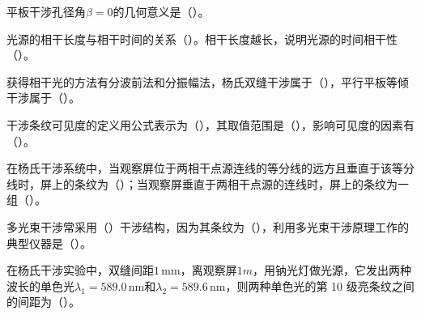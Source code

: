 \documentclass[padl, analysis, notocnum]{ExBook}
\newcommand{\answerarea}[1][3.5cm]{%
  \par\vspace{1mm}%
  \noindent{\color{themeColor!35}\rule{\linewidth}{0.4pt}}\par
  \noindent\begin{minipage}[t][#1][t]{\linewidth}\vspace{0pt}\end{minipage}\par
  \noindent{\color{themeColor!35}\rule{\linewidth}{0.4pt}}\par
}
\begin{document}
\begin{qitems}[startnum=2]
\qitem 平板干涉孔径角$\beta =0$的几何意义是（\hspace{1.6em}）。
\label{q:225:start}
\answerarea[4.0cm]
\label{q:225:end}
\end{qitems}

\begin{qitems}[startnum=3]
\qitem 光源的相干长度与相干时间的关系（\hspace{1.6em}）。相干长度越长，说明光源的时间相干性（\hspace{1.6em}）。
\label{q:226:start}
\answerarea[4.0cm]
\label{q:226:end}
\end{qitems}

\begin{qitems}[startnum=4]
\qitem 获得相干光的方法有分波前法和分振幅法，杨氏双缝干涉属于（\hspace{1.6em}），平行平板等倾干涉属于（\hspace{1.6em}）。
\label{q:227:start}
\answerarea[4.0cm]
\label{q:227:end}
\end{qitems}

\begin{qitems}[startnum=5]
\qitem 干涉条纹可见度的定义用公式表示为（\hspace{1.6em}），其取值范围是（\hspace{1.6em}），影响可见度的因素有（\hspace{1.6em}）。
\label{q:228:start}
\answerarea[4.0cm]
\label{q:228:end}
\end{qitems}

\begin{qitems}[startnum=6]
\qitem 在杨氏干涉系统中，当观察屏位于两相干点源连线的等分线的远方且垂直于该等分线时，屏上的条纹为（\hspace{1.6em}）；当观察屏垂直于两相干点源的连线时，屏上的条纹为一组（\hspace{1.6em}）。
\label{q:229:start}
\answerarea[4.0cm]
\label{q:229:end}
\end{qitems}

\begin{qitems}[startnum=7]
\qitem 多光束干涉常采用（\hspace{1.6em}）干涉结构，因为其条纹为（\hspace{1.6em}），利用多光束干涉原理工作的典型仪器是（\hspace{1.6em}）。
\label{q:230:start}
\answerarea[4.0cm]
\label{q:230:end}
\end{qitems}

\begin{qitems}[startnum=8]
\qitem 在杨氏干涉实验中，双缝间距$1\,\mathrm{mm}$，离观察屏$1m$，用钠光灯做光源，它发出两种波长的单色光$\lambda_{1}=589.0\,\mathrm{nm}$和$\lambda_{2}=589.6\,\mathrm{nm}$，则两种单色光的第 10 级亮条纹之间的间距为（\hspace{1.6em}）。
\label{q:231:start}
\answerarea[4.0cm]
\label{q:231:end}
\end{qitems}
\end{document}
